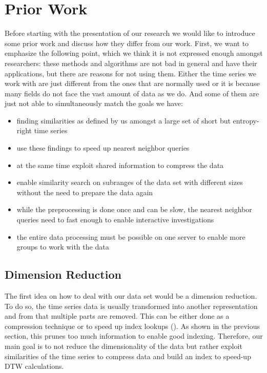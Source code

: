 \chapter{Prior Work}
\label{ch:prior}

Before starting with the presentation of our research we would like to introduce some prior work and discuss how they differ from our work. First, we want to emphasize the following point, which we think it is not expressed enough amongst researchers: these methods and algorithms are not bad in general and have their applications, but there are reasons for not using them. Either the time series we work with are just different from the ones that are normally used or it is because many fields do not face the vast amount of data as we do. And some of them are just not able to simultaneously match the goals we have:

\begin{itemize}
    \item finding similarities as defined by us amongst a large set of short but entropy-right time series
    \item use these findings to speed up nearest neighbor queries
    \item at the same time exploit shared information to compress the data
    \item enable similarity search on subranges of the data set with different sizes without the need to prepare the data again
    \item while the preprocessing is done once and can be slow, the nearest neighbor queries need to fast enough to enable interactive investigations
    \item the entire data processing must be possible on one server to enable more groups to work with the data
\end{itemize}



\section{Dimension Reduction}
\label{sec:prior:dimred}

The first idea on how to deal with our data set would be a dimension reduction. To do so, the time series data is usually transformed into another representation and from that multiple parts are removed. This can be either done as a compression technique or to speed up index lookups (\cite{LB_Keogh,LB_Improved,dimred1,dimred2}). As shown in the previous section, this prunes too much information to enable good indexing. Therefore, our main goal is to not reduce the dimensionality of the data but rather exploit similarities of the time series to compress data and build an index to speed-up DTW calculations.



